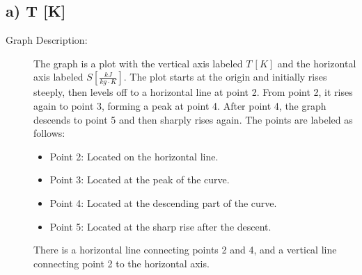 \subsection*{a) T [K]}
\begin{description}
    \item[Graph Description:] 
    The graph is a plot with the vertical axis labeled \( T \, [K] \) and the horizontal axis labeled \( S \left[ \frac{kJ}{kg \cdot K} \right] \). The plot starts at the origin and initially rises steeply, then levels off to a horizontal line at point 2. From point 2, it rises again to point 3, forming a peak at point 4. After point 4, the graph descends to point 5 and then sharply rises again. The points are labeled as follows:
    \begin{itemize}
        \item Point 2: Located on the horizontal line.
        \item Point 3: Located at the peak of the curve.
        \item Point 4: Located at the descending part of the curve.
        \item Point 5: Located at the sharp rise after the descent.
    \end{itemize}
    There is a horizontal line connecting points 2 and 4, and a vertical line connecting point 2 to the horizontal axis.
\end{description}